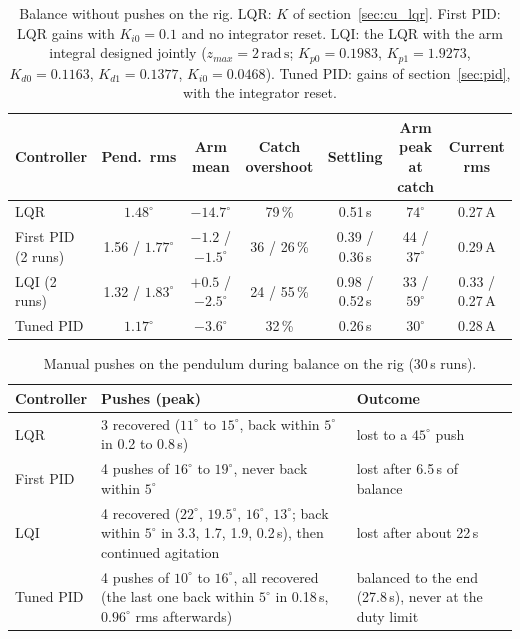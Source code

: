 \documentclass[a4paper,11pt]{article}
\begin{document}
\begin{table}[htbp]
\centering
\caption{Balance without pushes on the rig. LQR: $K$ of section~\ref{sec:cu_lqr}. First PID: LQR gains with $K_{i0}=0.1$ and no integrator reset. LQI: the LQR with the arm integral designed jointly ($z_{max}=2\,\mathrm{rad\,s}$; $K_{p0}=0.1983$, $K_{p1}=1.9273$, $K_{d0}=0.1163$, $K_{d1}=0.1377$, $K_{i0}=0.0468$). Tuned PID: gains of section~\ref{sec:pid}, with the integrator reset.}
\label{tab:pid_rig}
\small
\footnotesize
\setlength{\tabcolsep}{3pt}
\begin{tabular}{@{}lcccccc@{}}
\toprule
Controller & Pend.\ rms & Arm mean & Catch overshoot & Settling & Arm peak at catch & Current rms \\
\midrule
LQR & $1.48^\circ$ & $-14.7^\circ$ & 79\,\% & 0.51\,s & $74^\circ$ & 0.27\,A \\
First PID (2 runs) & 1.56 / $1.77^\circ$ & $-1.2$ / $-1.5^\circ$ & 36 / 26\,\% & 0.39 / 0.36\,s & 44 / $37^\circ$ & 0.29\,A \\
LQI (2 runs) & 1.32 / $1.83^\circ$ & $+0.5$ / $-2.5^\circ$ & 24 / 55\,\% & 0.98 / 0.52\,s & 33 / $59^\circ$ & 0.33 / 0.27\,A \\
Tuned PID & $1.17^\circ$ & $-3.6^\circ$ & 32\,\% & 0.26\,s & $30^\circ$ & 0.28\,A \\
\bottomrule
\end{tabular}
\end{table}

\begin{table}[htbp]
\centering
\caption{Manual pushes on the pendulum during balance on the rig (30\,s runs).}
\label{tab:pid_rig_push}
\small
\begin{tabular}{@{}lp{}p{}@{}}
\toprule
Controller & Pushes (peak) & Outcome \\
\midrule
LQR & 3 recovered ($11^\circ$ to $15^\circ$, back within $5^\circ$ in 0.2 to 0.8\,s) & lost to a $45^\circ$ push \\
First PID & 4 pushes of $16^\circ$ to $19^\circ$, never back within $5^\circ$ & lost after 6.5\,s of balance \\
LQI & 4 recovered ($22^\circ$, $19.5^\circ$, $16^\circ$, $13^\circ$; back within $5^\circ$ in 3.3, 1.7, 1.9, 0.2\,s), then continued agitation & lost after about 22\,s \\
Tuned PID & 4 pushes of $10^\circ$ to $16^\circ$, all recovered (the last one back within $5^\circ$ in 0.18\,s, $0.96^\circ$ rms afterwards) & balanced to the end (27.8\,s), never at the duty limit \\
\bottomrule
\end{tabular}
\end{table}
\end{document}
